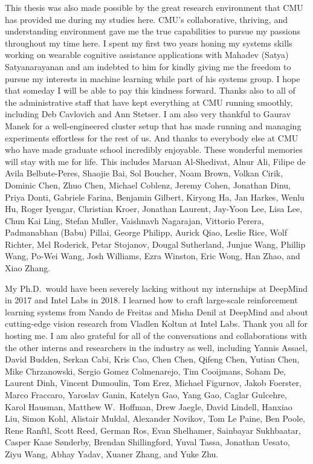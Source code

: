 \documentclass[12pt]{cmuthesis}
\begin{document}
\begin{acknowledgments}
  This thesis was also made possible by the great research
  environment that CMU has provided me during my studies here.
  CMU's collaborative, thriving, and understanding environment gave
  me the true capabilities to pursue my passions throughout my time here.
  I spent my first two years honing my systems skills working on
  wearable cognitive assistance applications with
  Mahadev (Satya) Satyanarayanan and am
  indebted to him for kindly giving me the freedom to pursue my
  interests in machine learning while part of his systems group.
  I hope that someday I will be able to pay this kindness forward.
  Thanks also to all of the administrative staff that have
  kept everything at CMU running smoothly, including
  Deb Cavlovich and Ann Stetser.
  I am also very thankful to Gaurav Manek for a well-engineered
  cluster setup that has made running and managing
  experiments effortless for the rest of us.
  And thanks to everybody else at CMU who have made
  graduate school incredibly enjoyable.
  These wonderful memories will stay with me for life.
  This includes
  Maruan Al-Shedivat,
  Alnur Ali,
  Filipe de Avila Belbute-Peres,
  Shaojie Bai,
  Sol Boucher,
  Noam Brown,
  Volkan Cirik,
  Dominic Chen,
  Zhuo Chen,
  Michael Coblenz,
  Jeremy Cohen,
  Jonathan Dinu,
  Priya Donti,
  Gabriele Farina,
  Benjamin Gilbert,
  Kiryong Ha,
  Jan Harkes,
  Wenlu Hu,
  Roger Iyengar,
  Christian Kroer,
  Jonathan Laurent,
  Jay-Yoon Lee,
  Lisa Lee,
  Chun Kai Ling,
  Stefan Muller,
  Vaishnavh Nagarajan,
  Vittorio Perera,
  Padmanabhan (Babu) Pillai,
  George Philipp,
  Aurick Qiao,
  Leslie Rice,
  Wolf Richter,
  Mel Roderick,
  Petar Stojanov,
  Dougal Sutherland,
  Junjue Wang,
  Phillip Wang,
  Po-Wei Wang,
  Josh Williams,
  Ezra Winston,
  Eric Wong,
  Han Zhao, and
  Xiao Zhang.

  My Ph.D.~would have been severely lacking without my internships
  at DeepMind in 2017 and Intel Labs in 2018.
  I learned how to craft large-scale reinforcement learning systems
  from Nando de Freitas and Misha Denil at DeepMind and
  about cutting-edge vision research from
  Vladlen Koltun at Intel Labs.
  Thank you all for hosting me.
  I am also grateful for all of the conversations and collaborations
  with the other interns and researchers in the industry as well,
  including
  Yannis Assael,
  David Budden,
  Serkan Cabi,
  Kris Cao,
  Chen Chen,
  Qifeng Chen,
  Yutian Chen,
  Mike Chrzanowski,
  Sergio Gomez Colmenarejo,
  Tim Cooijmans,
  Soham De,
  Laurent Dinh,
  Vincent Dumoulin,
  Tom Erez,
  Michael Figurnov,
  Jakob Foerster,
  Marco Fraccaro,
  Yaroslav Ganin,
  Katelyn Gao,
  Yang Gao,
  Caglar Gulcehre,
  Karol Hausman,
  Matthew W.~Hoffman,
  Drew Jaegle,
  David Lindell,
  Hanxiao Liu,
  Simon Kohl,
  Alistair Muldal,
  Alexander Novikov,
  Tom Le Paine,
  Ben Poole,
  Rene Ranftl,
  Scott Reed,
  German Ros,
  Evan Shelhamer,
  Sainbayar Sukhbaatar,
  Casper Kaae Sønderby,
  Brendan Shillingford,
  Yuval Tassa,
  Jonathan Uesato,
  Ziyu Wang,
  Abhay Yadav,
  Xuaner Zhang, and
  Yuke Zhu.


\end{acknowledgments}
\end{document}
